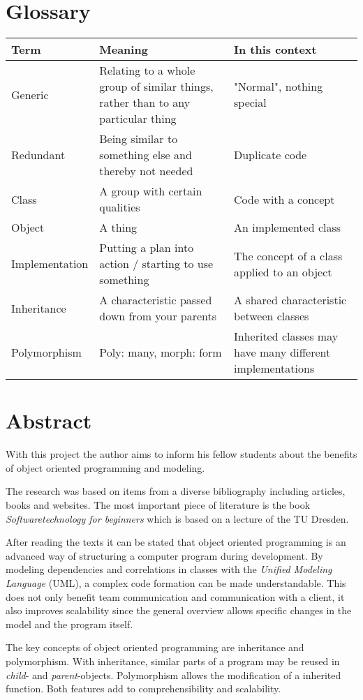 \section*{Glossary}
\begin{tabular}{L{0.22} L{0.39}  L{0.39}}
Term & Meaning & In this context\\
\hline
Generic & Relating to a whole group of similar things, rather than to any particular thing & "Normal", nothing special\\
Redundant & Being similar to something else and thereby not needed & Duplicate code\\
Class & A group with certain qualities & Code with a concept\\
Object & A thing & An implemented class \\
Implementation & Putting a plan into action / starting to use something & The concept of a class applied to an object\\
Inheritance & A characteristic passed down from your parents & A shared characteristic between classes\\
Polymorphism & Poly: many, morph: form & Inherited classes may have many different implementations\\
\end{tabular}
\newpage
\section*{Abstract}

With this project the author aims to inform his fellow students about the benefits of object oriented programming and modeling.\medskip

The research was based on items from a diverse bibliography including articles, books and websites. The most important piece of literature is the book \emph{Softwaretechnology for beginners} which is based on a lecture of the TU Dresden.\medskip

After reading the texts it can be stated that object oriented programming is an advanced way of structuring a computer program during development. By modeling dependencies and correlations in classes with the \emph{Unified Modeling Language} (UML), a complex code formation can be made understandable. This does not only benefit team communication and communication with a client, it also improves scalability since the general overview allows specific changes in the model and the program itself.

The key concepts of object oriented programming are inheritance and polymorphism. With inheritance, similar parts of a program may be reused in \emph{child}- and \emph{parent}-objects. Polymorphism allows the modification of a inherited function. Both features add to comprehensibility and scalability.\medskip

